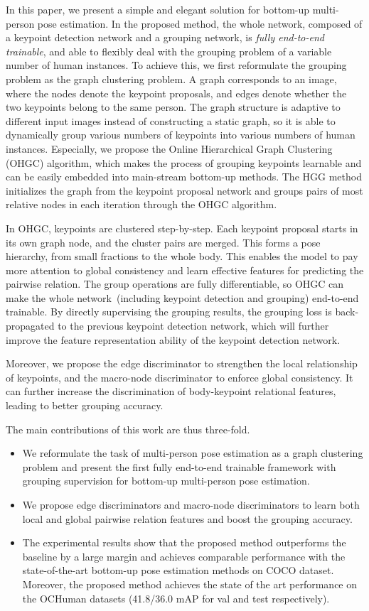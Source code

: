\documentclass[runningheads]{llncs}
\begin{document}
	In this paper, we present a simple and elegant solution for bottom-up multi-person pose estimation. In the proposed method, 
	the whole network, composed of a keypoint detection network and a grouping network, is \emph{fully end-to-end trainable},
	and able to	flexibly deal with the grouping problem of a variable number of human instances.
	To achieve this, we first reformulate the grouping problem as the graph clustering problem. 
	A graph corresponds to an image, where the nodes denote the keypoint proposals, and edges denote whether the two keypoints belong to the same person. The graph structure is adaptive to different input images instead of constructing a static graph, so it is able to dynamically group various numbers of keypoints into various numbers of human instances. Especially, we propose the Online Hierarchical Graph Clustering (OHGC) algorithm,
	which makes the process of grouping keypoints learnable and can be easily embedded into main-stream bottom-up methods. The HGG method initializes the graph from the keypoint proposal network and groups pairs of most relative nodes in each iteration through the OHGC algorithm.
	
	In OHGC, keypoints are clustered step-by-step.
	Each keypoint proposal starts in its own graph node, and the cluster pairs are merged. This forms a pose hierarchy, from small fractions to the whole body. This enables the model to pay more attention to global consistency and learn effective features for predicting the pairwise relation.
	The group operations are fully differentiable, so OHGC can make the whole network~(including keypoint detection and grouping) end-to-end trainable. By directly supervising the grouping results, the grouping loss is back-propagated to the previous keypoint detection network, which will further improve the feature representation ability of the keypoint detection network. 
	
	Moreover, we propose the edge discriminator to strengthen the local relationship of keypoints, and the macro-node discriminator to enforce global consistency. It can further increase the discrimination of body-keypoint relational features, leading to better grouping accuracy.
	
	The main contributions of this work are thus three-fold.	
	\begin{itemize}
		\itemsep 0.1cm
		\item We reformulate the task of multi-person pose estimation as a graph clustering problem and present the first fully end-to-end trainable framework with grouping supervision for bottom-up multi-person pose estimation.
		\item We propose edge discriminators and macro-node discriminators to learn both local and global pairwise relation features and boost the grouping accuracy. 
		\item The experimental results show that the proposed method outperforms the baseline by a large margin and achieves comparable performance with the state-of-the-art bottom-up pose estimation methods on COCO dataset. Moreover, the proposed method achieves the state of the art performance on the OCHuman datasets (41.8/36.0 mAP for val and test respectively).
	\end{itemize}
	
\end{document}

